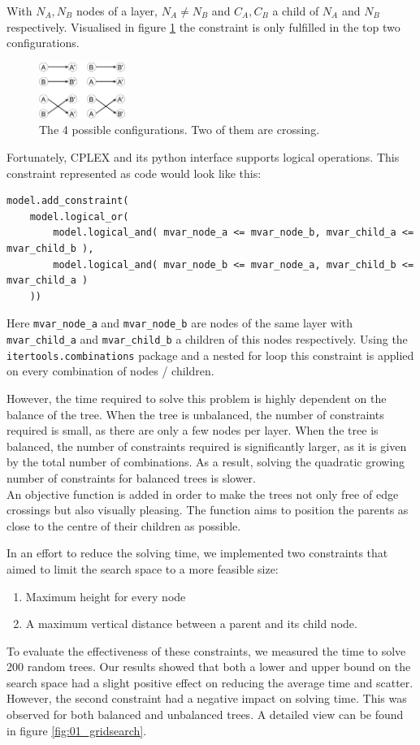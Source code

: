 \documentclass{article}
\begin{document}
With $N_A, N_B$ nodes of a layer, $N_A \neq N_B$ and $C_A, C_B$ a child of $N_A$ and $N_B$ respectively. 
Visualised in figure \ref{fig:crossing} the constraint is only fulfilled in the top two configurations.
\begin{figure}[H]
    \centering
    \includegraphics[width=0.25\textwidth]{figures/crossing.pdf} 
    \caption{The 4 possible configurations. Two of them are crossing.}
    \label{fig:crossing}
\end{figure}

Fortunately, CPLEX and its python interface supports logical operations. This constraint represented as code would look like this:
\begin{verbatim}
model.add_constraint(
    model.logical_or(
        model.logical_and( mvar_node_a <= mvar_node_b, mvar_child_a <= mvar_child_b ),
        model.logical_and( mvar_node_b <= mvar_node_a, mvar_child_b <= mvar_child_a )
    ))    
\end{verbatim}
Here \texttt{mvar\_node\_a} and \texttt{mvar\_node\_b} are nodes of the same layer with \texttt{mvar\_child\_a} and \texttt{mvar\_child\_b} a children of this nodes respectively.
Using the \texttt{itertools.combinations} package and a nested for loop this constraint is applied on every combination of nodes / children.

However, the time required to solve this problem is highly dependent on the balance of the tree. When the tree is unbalanced, the number of constraints required is small, as there are only a few nodes per layer. When the tree is balanced, the number of constraints required is significantly larger, as it is given by the total number of combinations. As a result, solving the quadratic growing number of constraints for balanced trees is slower.\\
An objective function is added in order to make the trees not only free of edge crossings but also visually pleasing. The function aims to position the parents as close to the centre of their children as possible.

In an effort to reduce the solving time, we implemented two constraints that aimed to limit the search space to a more feasible size:
\begin{enumerate}
    \item Maximum height for every node
    \item A maximum vertical distance between a parent and its child node.
\end{enumerate}
To evaluate the effectiveness of these constraints, we measured the time to solve 200 random trees. Our results showed that both a lower and upper bound on the search space had a slight positive effect on reducing the average time and scatter. However, the second constraint had a negative impact on solving time. This was observed for both balanced and unbalanced trees. A detailed view can be found in figure \ref{fig:01_gridsearch}.
\end{document}
